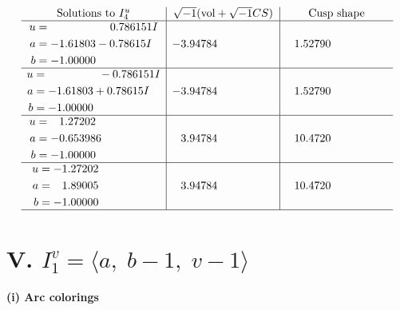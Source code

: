 \documentclass[1p]{elsarticle_modified}
\theoremstyle{definition}
\newcommand{\I}{\sqrt{-1}}
\begin{document}
$$\begin{array}{c|c|c}  
\text{Solutions to }I^u_{4}& \I (\text{vol} + \sqrt{-1}CS) & \text{Cusp shape}\\
 \hline 
\begin{aligned}
u &= \phantom{-0.000000 -}0.786151 I \\
a &= -1.61803 - 0.78615 I \\
b &= -1.00000\phantom{ +0.000000I}\end{aligned}
 & -3.94784\phantom{ +0.000000I} & \phantom{-}1.52790\phantom{ +0.000000I} \\ \hline\begin{aligned}
u &= \phantom{-0.000000 } -0.786151 I \\
a &= -1.61803 + 0.78615 I \\
b &= -1.00000\phantom{ +0.000000I}\end{aligned}
 & -3.94784\phantom{ +0.000000I} & \phantom{-}1.52790\phantom{ +0.000000I} \\ \hline\begin{aligned}
u &= \phantom{-}1.27202\phantom{ +0.000000I} \\
a &= -0.653986\phantom{ +0.000000I} \\
b &= -1.00000\phantom{ +0.000000I}\end{aligned}
 & \phantom{-}3.94784\phantom{ +0.000000I} & \phantom{-}10.4720\phantom{ +0.000000I} \\ \hline\begin{aligned}
u &= -1.27202\phantom{ +0.000000I} \\
a &= \phantom{-}1.89005\phantom{ +0.000000I} \\
b &= -1.00000\phantom{ +0.000000I}\end{aligned}
 & \phantom{-}3.94784\phantom{ +0.000000I} & \phantom{-}10.4720\phantom{ +0.000000I}\\
 \hline 
 \end{array}$$\newpage\newpage\renewcommand{\arraystretch}{1}
\centering \section*{V. $I^v_{1}= \langle a,\;b-1,\;v-1 \rangle$}
\flushleft \textbf{(i) Arc colorings}\\
\end{document}
